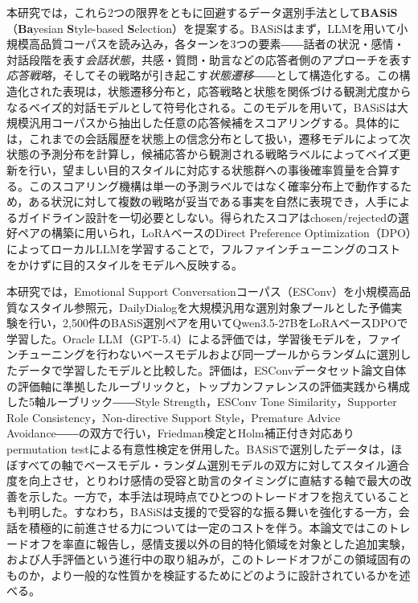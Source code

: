 \documentclass[manuscript,review,anonymous]{acmart}
\begin{document}
本研究では，これら2つの限界をともに回避するデータ選別手法として\textbf{BASiS}（\textbf{Ba}yesian \textbf{S}tyle-based \textbf{S}election）を提案する。BASiSはまず，LLMを用いて小規模高品質コーパスを読み込み，各ターンを3つの要素――話者の状況・感情・対話段階を表す\emph{会話状態}，共感・質問・助言などの応答者側のアプローチを表す\emph{応答戦略}，そしてその戦略が引き起こす\emph{状態遷移}――として構造化する。この構造化された表現は，状態遷移分布と，応答戦略と状態を関係づける観測尤度からなるベイズ的対話モデルとして符号化される。このモデルを用いて，BASiSは大規模汎用コーパスから抽出した任意の応答候補をスコアリングする。具体的には，これまでの会話履歴を状態上の信念分布として扱い，遷移モデルによって次状態の予測分布を計算し，候補応答から観測される戦略ラベルによってベイズ更新を行い，望ましい目的スタイルに対応する状態群への事後確率質量を合算する。このスコアリング機構は単一の予測ラベルではなく確率分布上で動作するため，ある状況に対して複数の戦略が妥当である事実を自然に表現でき，人手によるガイドライン設計を一切必要としない。得られたスコアはchosen/rejectedの選好ペアの構築に用いられ，LoRAベースのDirect Preference Optimization（DPO）によってローカルLLMを学習することで，フルファインチューニングのコストをかけずに目的スタイルをモデルへ反映する。

本研究では，Emotional Support Conversationコーパス（ESConv）\cite{liu2021esconv}を小規模高品質なスタイル参照元，DailyDialog\cite{li2017dailydialog}を大規模汎用な選別対象プールとした予備実験を行い，2{,}500件のBASiS選別ペアを用いてQwen3.5-27BをLoRAベースDPOで学習した。Oracle LLM（GPT-5.4）による評価では，学習後モデルを，ファインチューニングを行わないベースモデルおよび同一プールからランダムに選別したデータで学習したモデルと比較した。評価は，ESConvデータセット論文自体の評価軸に準拠したルーブリックと，トップカンファレンスの評価実践から構成した5軸ルーブリック――Style Strength，ESConv Tone Similarity，Supporter Role Consistency，Non-directive Support Style，Premature Advice Avoidance\cite{mir2019styletransfer,liu2021esconv,zhang2018persona,deng2023mixedinitiative}――の双方で行い，Friedman検定とHolm補正付き対応ありpermutation testによる有意性検定を併用した。BASiSで選別したデータは，ほぼすべての軸でベースモデル・ランダム選別モデルの双方に対してスタイル適合度を向上させ，とりわけ感情の受容と助言のタイミングに直結する軸で最大の改善を示した。一方で，本手法は現時点でひとつのトレードオフを抱えていることも判明した。すなわち，BASiSは支援的で受容的な振る舞いを強化する一方，会話を積極的に前進させる力については一定のコストを伴う。本論文ではこのトレードオフを率直に報告し，感情支援以外の目的特化領域を対象とした追加実験，および人手評価という進行中の取り組みが，このトレードオフがこの領域固有のものか，より一般的な性質かを検証するためにどのように設計されているかを述べる。
\end{document}
